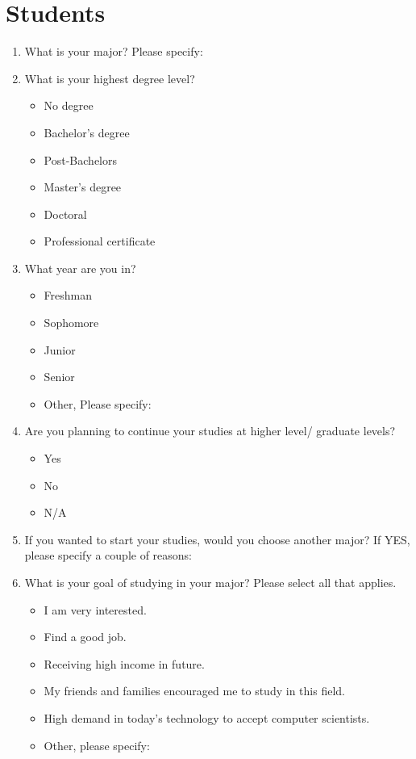 \documentclass[12pt,a4paper,titlepage]{article}
\begin{document}
\section {Students}
\begin{enumerate}

	\item What is your major? Please specify:
	
	\item What is your highest degree level?
	\begin{itemize}
		\item No degree
		\item Bachelor's degree
		\item Post-Bachelors
		\item Master's degree
		\item Doctoral
		\item Professional certificate
	\end{itemize}
	
	\item What year are you in?
	\begin{itemize}
		\item Freshman
		\item Sophomore
		\item Junior
		\item Senior
		\item Other, Please specify:
	\end{itemize}
	
	\item Are you planning to continue your studies at higher level/ graduate levels?
	\begin{itemize}
		\item Yes
		\item No
		\item N/A
	\end{itemize}
	
	\item If you wanted to start your studies, would you choose another major? If YES, please specify a couple of reasons:
	
	\item What is your goal of studying in your major? Please select all that applies.
	\begin{itemize}
	\renewcommand{\labelitemi}{\scriptsize$\square$}
		\item I am very interested.
		\item Find a good job.
		\item Receiving high income in future.
		\item My friends and families encouraged me to study in this field.
		\item High demand in today's technology to accept computer scientists.
		\item Other, please specify:
	\end{itemize}
	

\end{enumerate}
\end{document}
